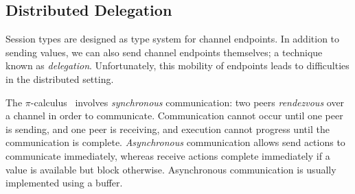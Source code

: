 \documentclass[
graybox,
envcountchap
]{svmult}
\begin{document}
\begin{bibunit}
  \subsection{Distributed Delegation}\label{sec:bt:distrib-deleg}
  Session types are designed as type system for channel endpoints.
  In addition to sending values, we can also send channel endpoints themselves;
  a technique known as \emph{delegation}. Unfortunately, this mobility of
  endpoints leads to difficulties in the distributed setting.

  The $\pi$-calculus~\cite{Milner99:pi-calc} involves \emph{synchronous}
  communication: two peers \emph{rendezvous} over a channel in order to
  communicate. Communication cannot occur until one peer is sending, and one
  peer is receiving, and execution cannot progress until the communication is
  complete. \emph{Asynchronous} communication allows send actions to communicate
  immediately, whereas receive actions complete immediately if a value is
  available but block otherwise.  Asynchronous communication is usually
  implemented using a buffer.



\end{bibunit}
\end{document}
